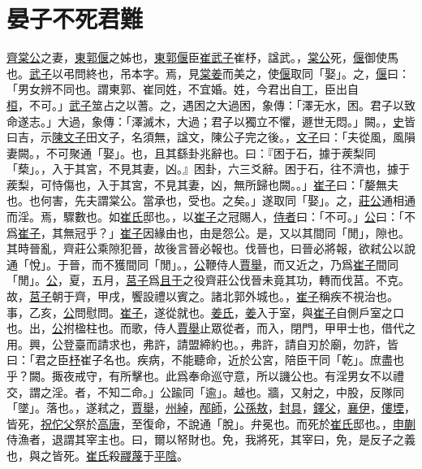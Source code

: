 \documentclass{article}
\newcommand{\tsu}{\small\kaishu\color{brown}}
\begin{document}
\section{晏子不死君難}

\noindent{\tsu 襄公二十五年}

\uline{齊棠公}之妻，\uline{東郭偃}之姊也，\uline{東郭偃}臣\uline{崔武子}{\tsu 崔杼，諡武。}，\uline{棠公}死，\uline{偃}御{\tsu 使馬也。}\uline{武子}以弔{\tsu 問終也，吊本字。}焉，見\uline{棠姜}而美之，使\uline{偃}取{\tsu 同「娶」。}之，\uline{偃}曰：「男女辨{\tsu 不同也。謂東郭、崔同姓，不宜婚。}姓，今君出自\uline{丁}，臣出自\uline{桓}，不可。」\uline{武子}筮{\tsu 占之以蓍。}之，遇困之大過{\tsu 困，象傳：「澤无水，困。君子以致命遂志。」大過，象傳：「澤滅木，大過；君子以獨立不懼，遯世无悶。」闕。}，\uline{史}皆曰吉，示\uline{陳文子}{\tsu 田文子，名須無，諡文，陳公子完之後。}，\uline{文子}曰：「夫從風，風隕妻{\tsu 闕。}，不可聚{\tsu 通「娶」。}也，且其繇{\tsu 卦兆辭也。}曰：『困于石，據于蒺梨{\tsu 同「蔾」。}，入于其宮，不見其妻，凶。』{\tsu 困卦，六三爻辭。}困于石，往不濟也，據于蒺梨，可恃傷也，入于其宮，不見其妻，凶，無所歸也{\tsu 闕。}。」\uline{崔子}曰：「嫠{\tsu 無夫也。}也何害，先夫{\tsu 謂棠公。}當{\tsu 承也，受也。}之矣。」遂取{\tsu 同「娶」。}之，\uline{莊公}通{\tsu 相通而淫。}焉，驟{\tsu 數也。}如\uline{崔氏}{\tsu 邸也。}，以\uline{崔子}之冠賜人，\uline{侍者}曰：「不可。」\uline{公}曰：「不爲\uline{崔子}，其無冠乎？」\uline{崔子}因{\tsu 緣由也，由是怨公。}是，又以其間{\tsu 同「閒」，隙也。其時晉亂，齊莊公乘隙犯晉，故後言晉必報也。}伐晉也，曰晉必將報，欲弒公以說{\tsu 通「悅」。}于晉，而不獲間{\tsu 同「閒」。}，\uline{公}鞭侍人\uline{賈舉}，而又近之，乃爲\uline{崔子}間{\tsu 同「閒」。}\uline{公}，夏，五月，\uline{莒子}爲\uline{且于}之役{\tsu 齊莊公伐晉未竟其功，轉而伐莒。不克。}故，\uline{莒子}朝于齊，甲戌，饗{\tsu 設禮以賓之。}諸北郭{\tsu 外城也。}，\uline{崔子}稱疾不視{\tsu 治也。}事，乙亥，\uline{公}問{\tsu 慰問。}\uline{崔子}，遂從{\tsu 就也。}\uline{姜氏}，\uline{姜}入于室，與\uline{崔子}自側戶{\tsu 室之口也。}出，\uline{公}拊楹{\tsu 柱也。}而歌，侍人\uline{賈舉}止眾從者，而入，閉門，甲{\tsu 甲士也，借代之用。}興，公登臺而請{\tsu 求也}，弗許，請盟{\tsu 締約也。}，弗許，請自刃於廟，勿許，皆曰：「君之臣\uline{杼}{\tsu 崔子名也。}疾病，不能聽命，近於公宮，陪臣干{\tsu 同「乾」。庶盡也乎？闕。}掫{\tsu 夜戒守，有所擊也。此爲奉命巡守意，所以譏公也。}有淫{\tsu 男女不以禮交，謂之淫。}者，不知二命。」公踰{\tsu 同「逾」。越也。}牆，又射之，中股，反隊{\tsu 同「墜」。落也。}，遂弒之，\uline{賈舉}，\uline{州綽}，\uline{邴師}，\uline{公孫敖}，\uline{封具}，\uline{鐸父}，\uline{襄伊}，\uline{僂堙}，皆死，\uline{祝佗父}祭於\uline{高唐}，至復命，不說{\tsu 通「脫」。}弁{\tsu 冕也。}而死於\uline{崔氏}{\tsu 邸也。}，\uline{申蒯}侍漁者，退謂其宰{\tsu 主也。}曰，爾以帑{\tsu 財也。}免，我將死，其宰曰，免，是反子之義也，與之皆死。\uline{崔氏}殺\uline{鬷蔑}于\uline{平陰}。
\end{document}

